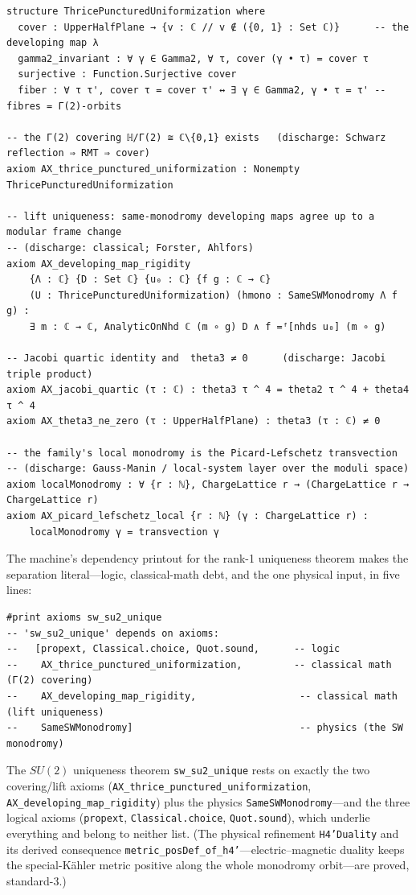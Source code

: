 \documentclass[11pt]{article}
\newcommand{\code}[1]{\texttt{#1}}
\begin{document}
\begin{Verbatim}
structure ThricePuncturedUniformization where
  cover : UpperHalfPlane → {v : ℂ // v ∉ ({0, 1} : Set ℂ)}      -- the developing map λ
  gamma2_invariant : ∀ γ ∈ Gamma2, ∀ τ, cover (γ • τ) = cover τ
  surjective : Function.Surjective cover
  fiber : ∀ τ τ', cover τ = cover τ' ↔ ∃ γ ∈ Gamma2, γ • τ = τ' -- fibres = Γ(2)-orbits

-- the Γ(2) covering ℍ/Γ(2) ≅ ℂ\{0,1} exists   (discharge: Schwarz reflection ⇒ RMT ⇒ cover)
axiom AX_thrice_punctured_uniformization : Nonempty ThricePuncturedUniformization

-- lift uniqueness: same-monodromy developing maps agree up to a modular frame change
-- (discharge: classical; Forster, Ahlfors)
axiom AX_developing_map_rigidity
    {Λ : ℂ} {D : Set ℂ} {u₀ : ℂ} {f g : ℂ → ℂ}
    (U : ThricePuncturedUniformization) (hmono : SameSWMonodromy Λ f g) :
    ∃ m : ℂ → ℂ, AnalyticOnNhd ℂ (m ∘ g) D ∧ f =ᶠ[nhds u₀] (m ∘ g)

-- Jacobi quartic identity and  theta3 ≠ 0      (discharge: Jacobi triple product)
axiom AX_jacobi_quartic (τ : ℂ) : theta3 τ ^ 4 = theta2 τ ^ 4 + theta4 τ ^ 4
axiom AX_theta3_ne_zero (τ : UpperHalfPlane) : theta3 (τ : ℂ) ≠ 0

-- the family's local monodromy is the Picard-Lefschetz transvection
-- (discharge: Gauss-Manin / local-system layer over the moduli space)
axiom localMonodromy : ∀ {r : ℕ}, ChargeLattice r → (ChargeLattice r → ChargeLattice r)
axiom AX_picard_lefschetz_local {r : ℕ} (γ : ChargeLattice r) :
    localMonodromy γ = transvection γ
\end{Verbatim}

\noindent The machine's dependency printout for the rank-1 uniqueness theorem makes the separation
literal---logic, classical-math debt, and the one physical input, in five lines:

\begin{Verbatim}
#print axioms sw_su2_unique
-- 'sw_su2_unique' depends on axioms:
--   [propext, Classical.choice, Quot.sound,      -- logic
--    AX_thrice_punctured_uniformization,         -- classical math (Γ(2) covering)
--    AX_developing_map_rigidity,                  -- classical math (lift uniqueness)
--    SameSWMonodromy]                             -- physics (the SW monodromy)
\end{Verbatim}

\noindent The $SU(2)$ uniqueness theorem \code{sw\_su2\_unique} rests on exactly the two
covering/lift axioms (\code{AX\_thrice\_punctured\_uniformization},
\code{AX\_developing\_map\_rigidity}) plus the physics \code{SameSWMonodromy}---and the three
logical axioms (\code{propext}, \code{Classical.choice}, \code{Quot.sound}), which underlie
everything and belong to neither list. (The physical refinement \code{H4'Duality} and its
derived consequence \code{metric\_posDef\_of\_h4'}---electric--magnetic duality keeps the
special-K\"ahler metric positive along the whole monodromy orbit---are proved, standard-3.)
\end{document}
